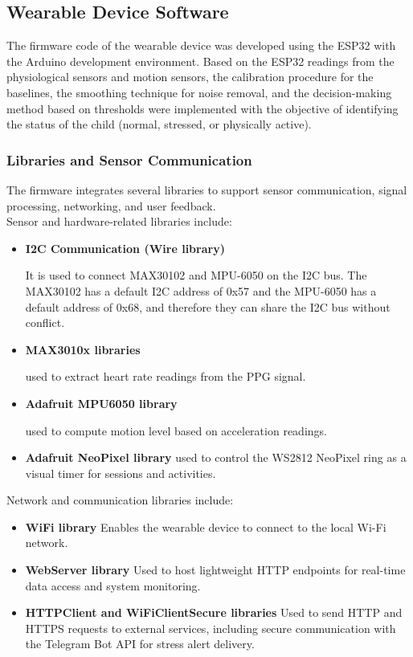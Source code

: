 \documentclass[a4paper,12pt]{report}
\begin{document}
\subsection{Wearable Device Software}
The firmware code of the wearable device was developed using the ESP32 with the Arduino development environment. Based on the ESP32 readings from the physiological sensors and motion sensors, the calibration procedure for the baselines, the smoothing technique for noise removal, and the decision-making method based on thresholds were implemented with the objective of identifying the status of the child (normal, stressed, or physically active).

\subsubsection{Libraries and Sensor Communication}
The firmware integrates several libraries to support sensor communication, signal processing, networking, and user feedback. \\[0.1cm]

Sensor and hardware-related libraries include:
\begin{itemize}
    \item \textbf{I2C Communication (Wire library)}

    It is used to connect MAX30102 and MPU-6050 on the I2C bus. The MAX30102 has a default I2C address of 0x57 and the MPU-6050 has a default address of 0x68, and therefore they can share the I2C bus without conflict.

    \item \textbf{MAX3010x libraries}

    used to extract heart rate readings from the PPG signal.
    \item \textbf{Adafruit MPU6050 library}

    used to compute motion level based on acceleration readings.
    \item \textbf{Adafruit NeoPixel library}
    used to control the WS2812 NeoPixel ring as a visual timer for sessions and activities.
\end{itemize}

Network and communication libraries include:\\[0.1cm]
\begin{itemize}
    \item \textbf{WiFi library}
    Enables the wearable device to connect to the local Wi-Fi network.
    \item \textbf{WebServer library}
    Used to host lightweight HTTP endpoints for real-time data access and system monitoring.

    \item \textbf{HTTPClient and WiFiClientSecure libraries}
    Used to send HTTP and HTTPS requests to external services, including secure communication with the Telegram Bot API for stress alert delivery.

\end{itemize}
\end{document}
